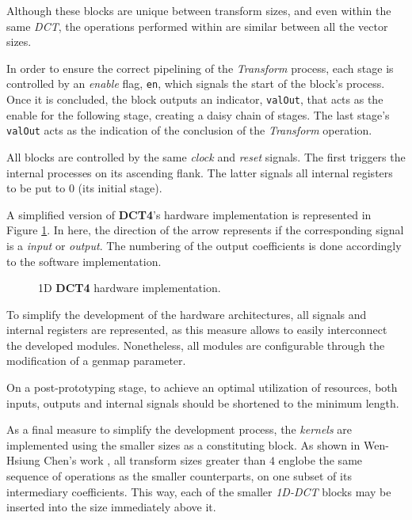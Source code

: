 Although these blocks are unique between transform sizes, and even within the same \emph{DCT}, the operations performed within are similar between all the vector sizes.

In order to ensure the correct pipelining of the \emph{Transform} process, each stage is controlled by an \emph{enable} flag, \texttt{en}, which signals the start of the block's process. Once it is concluded, the block outputs an indicator, \texttt{valOut}, that acts as the enable for the following stage, creating a daisy chain of stages. The last stage's \texttt{valOut} acts as the indication of the conclusion of the \emph{Transform} operation.

All blocks are controlled by the same \emph{clock} and \emph{reset} signals. The first triggers the internal processes on its ascending flank. The latter signals all internal registers to be put to 0 (its initial stage).

A simplified version of \textbf{DCT4}'s hardware implementation is represented in Figure \ref{fig:harddct4v1}. In here, the direction of the arrow represents if the corresponding signal is a \emph{input} or \emph{output}. The numbering of the output coefficients is done accordingly to the software implementation.

\begin{figure}[!htbp]
    \centering
    
    \caption{1D \textbf{DCT4} hardware implementation.}
    \label{fig:harddct4v1}
\end{figure}

To simplify the development of the hardware architectures, all signals and internal registers are represented, as this measure allows to easily interconnect the developed modules. Nonetheless, all modules are configurable through the modification of a \gls{genmap} parameter.

On a post-prototyping stage, to achieve an optimal utilization of resources, both inputs, outputs and internal signals should be shortened to the minimum length.

As a final measure to simplify the development process, the \emph{kernels} are implemented using the smaller sizes as a constituting block. As shown in Wen-Hsiung Chen's work \cite{wen-hsiungchenFastComputationalAlgorithm1977}, all transform sizes greater than $4$ englobe the same sequence of operations as the smaller counterparts, on one subset of its intermediary coefficients. This way, each of the smaller \emph{1D-DCT} blocks may be inserted into the size immediately above it.

